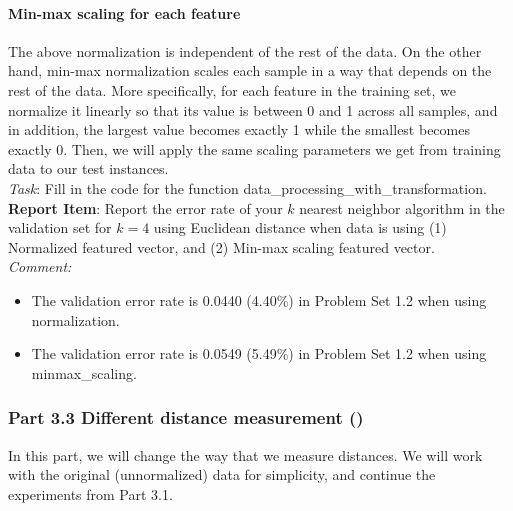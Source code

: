 \paragraph{Min-max scaling for each feature}
The above normalization is independent of the rest of the data. On the other hand, min-max normalization scales each sample in a way that depends on the rest of the data. More specifically, for each feature in the training set, we normalize it linearly so that its value is between 0 and 1 across all samples, and in addition, the largest value becomes exactly 1 while the smallest becomes exactly 0. Then, we will apply the same scaling parameters we get from training data to our test instances.\\

\noindent \emph{Task}: Fill in the code for the function \colorbox{Gainsboro!60!Lavender}{data\_processing\_with\_transformation}.\\

\noindent \textbf{Report Item}: Report the error rate of your $k$ nearest neighbor algorithm in the validation set for $k=4$ using Euclidean distance when data is using (1) Normalized featured vector, and (2) Min-max scaling featured vector.\\

\textit{Comment:}
\begin{itemize}
  \item The validation error rate is 0.0440 (4.40\%) in Problem Set 1.2 when using normalization.
  \item The validation error rate is 0.0549 (5.49\%) in Problem Set 1.2 when using minmax\_scaling.
\end{itemize}

\subsubsection*{Part 3.3 Different distance measurement ()}

In this part, we will change the way that we measure distances. We will work with the original (unnormalized) data for simplicity, and continue the experiments from Part 3.1. 

